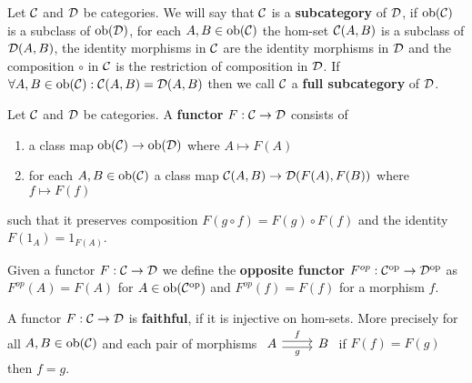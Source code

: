 \begin{definition}
        Let $\mathcal{C}$ and $\mathcal{D}$ be categories. We will say that $\mathcal{C}$ is a \textbf{subcategory} of $\mathcal{D}$, if 
        $\text{ob}(\mathcal{C})$ is a subclass of $\text{ob}(\mathcal{D})$, for each $A,B\in\text{ob}(\mathcal{C})$ the hom-set
        $\mathcal{C}(A,B)$ is a subclass of $\mathcal{D}(A,B)$, the identity morphisms in $\mathcal{C}$ are 
        the identity morphisms in $\mathcal{D}$ and the composition $\circ$ in $\mathcal{C}$ is the restriction of composition in $\mathcal{D}$.
        If $\forall A,B\in\text{ob}(\mathcal{C}) : \mathcal{C}(A,B) = \mathcal{D}(A,B)$
        then we call $\mathcal{C}$ a \textbf{full subcategory} of $\mathcal{D}$.    
\end{definition}
\begin{definition}
    Let $\mathcal{C}$ and $\mathcal{D}$ be categories. A \textbf{functor} $F: \mathcal{C} \to \mathcal{D}$ consists of 
    \begin{enumerate}
        \item a class map $\text{ob}(\mathcal{C})\to\text{ob}(\mathcal{D})$ where $A \mapsto F(A)$
        \item for each $A,B\in\text{ob}(\mathcal{C})$ a class map $\mathcal{C}(A,B)\to\mathcal{D}(F(A),F(B))$ where $f \mapsto F(f)$
    \end{enumerate}
    such that it preserves composition $F(g\circ f) = F(g)\circ F(f)$ and the identity $F(1_A) = 1_{F(A)}$.\par
    Given a functor $F: \mathcal{C}\to\mathcal{D}$ we define the \textbf{opposite functor} $F^{op}: \mathcal{C}^{\text{op}}\to\mathcal{D}^{\text{op}}$ as 
    $F^{op}(A) = F(A)$ for $A\in\text{ob}(\mathcal{C}^{\text{op}})$ and $F^{op}(f)=F(f)$ for a morphism $f$.\par
    A functor $F: \mathcal{C}\to\mathcal{D}$ is \textbf{faithful}, if it is injective on hom-sets. 
    More precisely for all $A,B\in\text{ob}(\mathcal{C})$ and each pair of morphisms $\begin{tikzcd}
        A & B
        \arrow["g"', shift right, from=1-1, to=1-2]
        \arrow["f", shift left, from=1-1, to=1-2]
    \end{tikzcd}$ if $F(f)=F(g)$ then $f=g$.\\ 
\end{definition}
